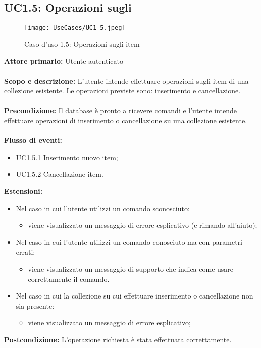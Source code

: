 \documentclass{scalatekids-article}
\begin{document}
\subsection{UC1.5: Operazioni sugli }
\begin{figure}[H]
  \begin{center}
    \texttt{[image: UseCases/UC1\_5.jpeg]}
    \caption{Caso d'uso 1.5: Operazioni sugli item}
  \end{center}
\end{figure}
\textbf{Attore primario:} Utente autenticato\\ \\
\textbf{Scopo e descrizione:} L'utente intende effettuare operazioni sugli item di una collezione esistente. Le operazioni previste sono:
inserimento e cancellazione.\\ \\
\textbf{Precondizione:} Il database è pronto a ricevere comandi e l'utente intende effettuare operazioni di inserimento o cancellazione su una collezione esistente.\\ \\
\textbf{Flusso di eventi:}
\begin{itemize}
\item UC1.5.1 Inserimento nuovo item;
\item UC1.5.2 Cancellazione item.
\end{itemize}
\textbf{Estensioni:}
\begin{itemize}
\item Nel caso in cui l'utente utilizzi un comando sconosciuto:
  \begin{itemize}
  \item viene visualizzato un messaggio di errore esplicativo (e rimando all'aiuto);
  \end{itemize}
\item Nel caso in cui l'utente utilizzi un comando conosciuto ma con parametri errati:
  \begin{itemize}
  \item viene visualizzato un messaggio di supporto che indica come usare correttamente il comando.
  \end{itemize}
\item Nel caso in cui la collezione su cui effettuare inserimento o cancellazione non sia presente:
  \begin{itemize}
  \item viene visualizzato un messaggio di errore esplicativo;
  \end{itemize}
\end{itemize}
\textbf{Postcondizione:} L'operazione richiesta è stata effettuata correttamente.
\end{document}
